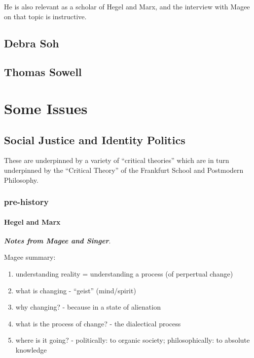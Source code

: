 \documentclass[10pt,titlepage]{book}
\begin{document}
He is also relevant as a scholar of Hegel and Marx, and the interview with Magee on that topic\cite{magee-singer} is instructive.

\section{Debra Soh}

\cite{soh-end}

\section{Thomas Sowell}

\cite{sowell-barbarians}

\chapter{Some Issues}

\section{Social Justice and Identity Politics}

These are underpinned by a variety of ``critical theories'' which are in turn underpinned by the ``Critical Theory'' of the Frankfurt School and Postmodern Philosophy.

\subsection{pre-history}

\subsubsection{Hegel and Marx}

{\bf\emph{Notes from Magee and Singer}}.

Magee\cite{magee-singer} summary:

\begin{enumerate}
\item understanding reality = understanding a process (of perpertual change)
\item what is changing - ``geist'' (mind/spirit)
\item why changing? - because in a state of alienation
\item what is the process of change? - the dialectical process
\item where is it going? - politically: to organic society; philosophically: to absolute knowledge
\end{enumerate}
\end{document}
